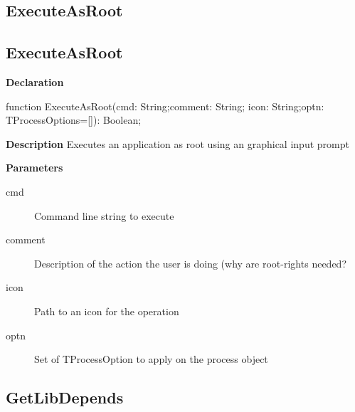 \documentclass{report}
\newif\ifpdf
\begin{document}
\subsection*{\large{\textbf{ExecuteAsRoot}}\normalsize\hspace{1ex}\hrulefill}
\else
\subsection*{ExecuteAsRoot}
\fi
\label{licommon-ExecuteAsRoot}
\begin{list}{}{
\setlength{\itemindent}{0cm}
\setlength{\listparindent}{0cm}
\setlength{\leftmargin}{\evensidemargin}
\addtolength{\leftmargin}{\tmplength}
\settowidth{\labelsep}{X}
\addtolength{\leftmargin}{\labelsep}
\setlength{\labelwidth}{\tmplength}
}
\item[\textbf{Declaration}\hfill]
\ifpdf
\begin{flushleft}
\fi
\begin{ttfamily}
function ExecuteAsRoot(cmd: String;comment: String; icon: String;optn: TProcessOptions=[]): Boolean;\end{ttfamily}

\ifpdf
\end{flushleft}
\fi

\par
\item[\textbf{Description}]
Executes an application as root using an graphical input prompt    \par
\item[\textbf{Parameters}]
\begin{description}
\item[cmd] Command line string to execute
\item[comment] Description of the action the user is doing (why are root{-}rights needed?
\item[icon] Path to an icon for the operation
\item[optn] Set of TProcessOption to apply on the process object
\end{description}


\end{list}
\ifpdf
\subsection*{\large{\textbf{GetLibDepends}}\normalsize\hspace{1ex}\hrulefill}
\else
\end{document}
